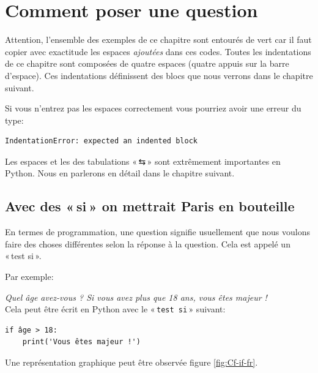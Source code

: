 


\chapter{Comment poser une question\label{chap:question}}

Attention, l'ensemble des exemples de ce chapitre sont entourés de vert car il faut copier avec exactitude les espaces \emph{ajoutées} dans ces codes. Toutes les indentations de ce chapitre sont composées de quatre espaces (quatre appuis sur la barre d'espace). Ces indentations définissent des blocs que nous verrons dans le chapitre suivant.

Si vous n'entrez pas les espaces correctement vous pourriez avoir une erreur du type:

\begin{Verbatim}[frame=single,rulecolor=\color{red}, label=erreur]
IndentationError: expected an indented block
\end{Verbatim}

\setsansfont[Mapping=tex-text]{DejaVu Sans}
Les espaces et les des tabulations « \textsf{⇆} » sont extrêmement importantes en Python. Nous en parlerons en détail dans le chapitre suivant.

\section{Avec des « si » on mettrait Paris en bouteille}
En termes de programmation, une question signifie usuellement que nous voulons faire des choses différentes selon 
la réponse à la question. Cela est appelé un « test si ».

Par exemple:

\emph{Quel âge avez-vous ? Si vous avez plus que 18 ans, vous êtes majeur !}\\


Cela peut être écrit en Python avec le « \texttt{test si} » suivant:
\begin{Verbatim}[frame=single,rulecolor=\color{gray}, label=ne pas saisir]
if âge > 18:
    print('Vous êtes majeur !')
\end{Verbatim}

Une représentation graphique peut être observée figure \ref{fig:Cf-if-fr}.

